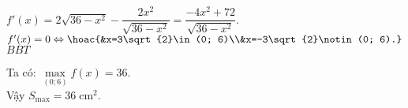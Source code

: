 \begin{ex}
{        $f'(x)=2\sqrt{36-x^2}-\dfrac{2x^2}{\sqrt{36-x^2}} =\dfrac{-4x^2+72}{\sqrt{36-x^2}}$.\\
        $f'(x)=0\Leftrightarrow\hoac{&x=3\sqrt{2}\in(0; 6)\\&x=-3\sqrt{2}\notin(0; 6).}$ \\
        $BBT$
        \begin{center}
        \end{center}
        Ta có: $\max\limits_{(0; 6)} f(x)=36$.\\
        Vậy $S_{\max} =36 \;\mathrm{cm}^2$.}
\end{ex}
